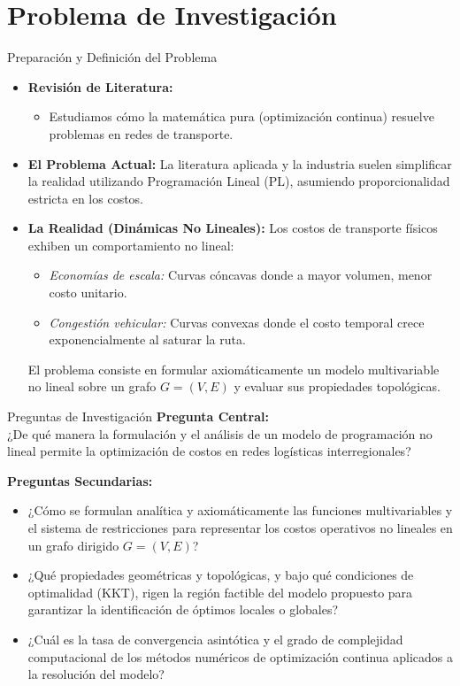 \documentclass[10pt]{beamer}
\begin{document}
\section{Problema de Investigación}

\begin{frame}{Preparación y Definición del Problema}
    \begin{itemize}
        \item \textbf{Revisión de Literatura:} 
        \begin{itemize}
            \item Estudiamos cómo la matemática pura (optimización continua) resuelve problemas en redes de transporte.
        \end{itemize}
        \item \textbf{El Problema Actual:} La literatura aplicada y la industria suelen simplificar la realidad utilizando Programación Lineal (PL), asumiendo proporcionalidad estricta en los costos.
        \item \textbf{La Realidad (Dinámicas No Lineales):} Los costos de transporte físicos exhiben un comportamiento no lineal:
        \begin{itemize}
            \item \textit{Economías de escala:} Curvas cóncavas donde a mayor volumen, menor costo unitario.
            \item \textit{Congestión vehicular:} Curvas convexas donde el costo temporal crece exponencialmente al saturar la ruta.
        \end{itemize}
        \alert{El problema consiste en formular axiomáticamente un modelo multivariable no lineal sobre un grafo $G=(V,E)$ y evaluar sus propiedades topológicas.}
    \end{itemize}
\end{frame}

\begin{frame}{Preguntas de Investigación}
    \textbf{Pregunta Central:}\\
    ¿De qué manera la formulación y el análisis de un modelo de programación no lineal permite la optimización de costos en redes logísticas interregionales?
    
    \vspace{0.3cm}
    \textbf{Preguntas Secundarias:}
    \small
    \begin{itemize}
        \item ¿Cómo se formulan analítica y axiomáticamente las funciones multivariables y el sistema de restricciones para representar los costos operativos no lineales en un grafo dirigido $G=(V,E)$?
        \item ¿Qué propiedades geométricas y topológicas, y bajo qué condiciones de optimalidad (KKT), rigen la región factible del modelo propuesto para garantizar la identificación de óptimos locales o globales?
        \item ¿Cuál es la tasa de convergencia asintótica y el grado de complejidad computacional de los métodos numéricos de optimización continua aplicados a la resolución del modelo?
    \end{itemize}
\end{frame}
\end{document}
